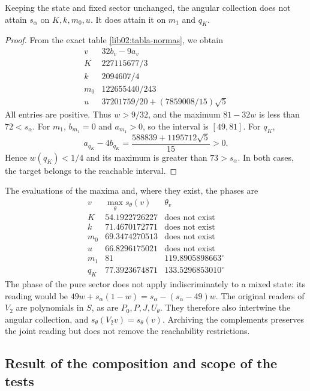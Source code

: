 \begin{corollary}
\label{lib02:seis-angulares}
Keeping the state and fixed sector unchanged, the angular collection does not attain \(s_\alpha\) on \(K,k,m_0,u\). It does attain it on \(m_1\) and \(q_K\).
\end{corollary}
\begin{proof}
From the exact table \eqref{lib02:tabla-normas}, we obtain
\[
\begin{array}{c|c}
 v&32b_v-9a_v\\\hline
 K&227115677/3\\
 k&2094607/4\\
 m_0&122655440/243\\
 u&37201759/20+(7859008/15)\sqrt5
\end{array}
\]
All entries are positive. Thus \(w>9/32\), and the maximum \(81-32w\) is less than \(72<s_\alpha\). For \(m_1\), \(b_{m_1}=0\) and \(a_{m_1}>0\), so the interval is \([49,81]\). For \(q_K\),
\[
 a_{q_K}-4b_{q_K}=\frac{588839+1195712\sqrt5}{15}>0.
\]
Hence \(w(q_K)<1/4\) and its maximum is greater than \(73>s_\alpha\). In both cases, the target belongs to the reachable interval.
\end{proof}

The evaluations of the maxima and, where they exist, the phases are
\[
\begin{array}{c|c|c}
 v&\max_\theta s_\theta(v)&\theta_v\\\hline
 K&54.1922726227&\text{does not exist}\\
 k&71.4670172771&\text{does not exist}\\
 m_0&69.3474270513&\text{does not exist}\\
 u&66.8296175021&\text{does not exist}\\
 m_1&81&119.8905898663^\circ\\
 q_K&77.3923674871&133.5296853010^\circ
\end{array}
\]
The phase of the pure sector does not apply indiscriminately to a mixed state: its reading would be \(49w+s_\alpha(1-w)=s_\alpha-(s_\alpha-49)w\). The original readers of \(V_2\) are polynomials in \(S\), as are \(P_0,P,J,U_\theta\). They therefore also intertwine the angular collection, and \(s_\theta(V_2v)=s_\theta(v)\). Archiving the complements preserves the joint reading but does not remove the reachability restrictions.

\subsection{Result of the composition and scope of the tests}
\label{lib02:alcance}

